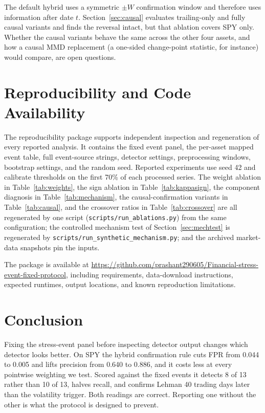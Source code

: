 \documentclass[pdflatex,sn-mathphys-num,iicol]{sn-jnl}
\begin{document}
The default hybrid uses a symmetric $\pm W$ confirmation window and therefore uses information after date $t$. Section~\ref{sec:causal} evaluates trailing-only and fully causal variants and finds the reversal intact, but that ablation covers SPY only. Whether the causal variants behave the same across the other four assets, and how a causal MMD replacement (a one-sided change-point statistic, for instance) would compare, are open questions.

\section{Reproducibility and Code Availability}
\label{sec:repro}
The reproducibility package supports independent inspection and regeneration of every reported analysis. It contains the fixed event panel, the per-asset mapped event table, full event-source strings, detector settings, preprocessing windows, bootstrap settings, and the random seed. Reported experiments use seed 42 and calibrate thresholds on the first 70\% of each processed series. The weight ablation in Table~\ref{tab:weights}, the sign ablation in Table~\ref{tab:kappasign}, the component diagnosis in Table~\ref{tab:mechanism}, the causal-confirmation variants in Table~\ref{tab:causal}, and the crossover ratios in Table~\ref{tab:crossover} are all regenerated by one script (\texttt{scripts/run\_ablations.py}) from the same configuration; the controlled mechanism test of Section~\ref{sec:mechtest} is regenerated by \texttt{scripts/run\_synthetic\_mechanism.py}; and the archived market-data snapshots pin the inputs.

The package is available at \url{https://github.com/prashant290605/Financial-stress-event-fixed-protocol}, including requirements, data-download instructions, expected runtimes, output locations, and known reproduction limitations.

\section{Conclusion}
\label{sec:conclusion}
Fixing the stress-event panel before inspecting detector output changes which detector looks better. On SPY the hybrid confirmation rule cuts FPR from 0.044 to 0.005 and lifts precision from 0.640 to 0.886, and it costs less at every pointwise weighting we test. Scored against the fixed events it detects 8 of 13 rather than 10 of 13, halves recall, and confirms Lehman 40 trading days later than the volatility trigger. Both readings are correct. Reporting one without the other is what the protocol is designed to prevent.
\end{document}
